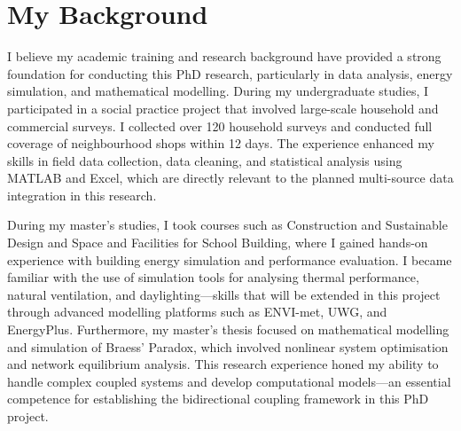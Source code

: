 \section{My Background}

I believe my academic training and research background have provided a strong foundation for conducting this PhD research, particularly in data analysis, energy simulation, and mathematical modelling. During my undergraduate studies, I participated in a social practice project that involved large-scale household and commercial surveys. I collected over 120 household surveys and conducted full coverage of neighbourhood shops within 12 days. The experience enhanced my skills in field data collection, data cleaning, and statistical analysis using MATLAB and Excel, which are directly relevant to the planned multi-source data integration in this research.

During my master's studies, I took courses such as Construction and Sustainable Design and Space and Facilities for School Building, where I gained hands-on experience with building energy simulation and performance evaluation. I became familiar with the use of simulation tools for analysing thermal performance, natural ventilation, and daylighting---skills that will be extended in this project through advanced modelling platforms such as ENVI-met, UWG, and EnergyPlus. Furthermore, my master's thesis focused on mathematical modelling and simulation of Braess' Paradox, which involved nonlinear system optimisation and network equilibrium analysis. This research experience honed my ability to handle complex coupled systems and develop computational models---an essential competence for establishing the bidirectional coupling framework in this PhD project.
